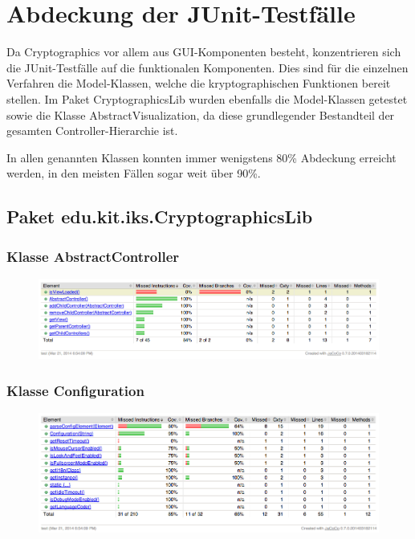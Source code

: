 \documentclass{article}
\begin{document}
\section{Abdeckung der JUnit-Testfälle}
  Da Cryptographics vor allem aus GUI-Komponenten besteht, konzentrieren sich die JUnit-Testfälle auf die
  funktionalen Komponenten. Dies sind für die einzelnen Verfahren die Model-Klassen, welche die kryptographischen
  Funktionen bereit stellen. Im Paket CryptographicsLib wurden ebenfalls die Model-Klassen getestet sowie die Klasse
  AbstractVisualization, da diese grundlegender Bestandteil der gesamten Controller-Hierarchie ist.

  In allen genannten Klassen konnten immer wenigstens 80\% Abdeckung erreicht werden, in den meisten Fällen sogar
  weit über 90\%.

  \subsection{Paket edu.kit.iks.CryptographicsLib}
    \subsubsection{Klasse AbstractController}
      \begin{figure}[H]
        \centering
          \includegraphics[width=\textwidth]{resources/coverage_lib_abstractcontroller}
      \end{figure}

    \subsubsection{Klasse Configuration}
      \begin{figure}[H]
        \centering
          \includegraphics[width=\textwidth]{resources/coverage_lib_configuration}
      \end{figure}
\end{document}
